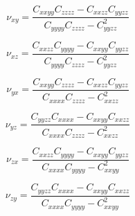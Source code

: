 $$
\nu_{xy} = \frac{C_{xxyy}C_{zzzz}-C_{xxzz}C_{yyzz}}{C_{yyyy}C_{zzzz}-C_{yyzz}^2}
$$

$$
\nu_{xz} = \frac{C_{xxzz}C_{yyyy}-C_{xxyy}C_{yyzz}}{C_{yyyy}C_{zzzz}-C_{yyzz}^2}
$$

$$
\nu_{yx} = \frac{C_{xxyy}C_{zzzz}-C_{xxzz}C_{yyzz}}{C_{xxxx}C_{zzzz}-C_{xxzz}^2}
$$

$$
\nu_{yz} = \frac{C_{yyzz}C_{xxxx}-C_{xxyy}C_{xxzz}}{C_{xxxx}C_{zzzz}-C_{xxzz}^2}
$$

$$
\nu_{zx} = \frac{C_{xxzz}C_{yyyy}-C_{xxyy}C_{yyzz}}{C_{xxxx}C_{yyyy}-C_{xxyy}^2}
$$

$$
\nu_{zy} = \frac{C_{yyzz}C_{xxxx}-C_{xxyy}C_{xxzz}}{C_{xxxx}C_{yyyy}-C_{xxyy}^2}
$$
